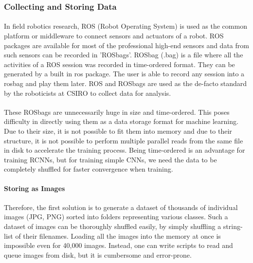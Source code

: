 \newpage
\subsubsection{Collecting and Storing Data}

\paragraph{}
In field robotics research, ROS (Robot Operating System) is used as the common platform or middleware to connect sensors and actuators of a robot. ROS packages are available for most of the professional high-end sensors and data from such sensors can be recorded in 'ROSbags'. ROSbag (.bag) is a file where all the activities of a ROS session was recorded in time-ordered format. They can be generated by a built in ros package. The user is able to record any session into a rosbag and play them later. ROS and ROSbags are used as the de-facto standard by the roboticists at CSIRO to collect data for analysis.

\paragraph{}
These ROSbags are unnecessarily huge in size and time-ordered. This poses difficulty in directly using them as a data storage format for machine learning. Due to their size, it is not possible to fit them into memory and due to their structure, it is not possible to perform multiple parallel reads from the same file in disk to accelerate the training process. Being time-ordered is an advantage for training RCNNs, but for training simple CNNs, we need the data to be completely shuffled for faster convergence when training.

\paragraph{}
\textbf{Storing as Images}

\paragraph{}
Therefore, the first solution is to generate a dataset of thousands of individual images (JPG, PNG) sorted into folders representing various classes. Such a dataset of images can be thoroughly shuffled easily, by simply shuffling a string-list of their filenames. Loading all the images into the memory at once is impossible even for 40,000 images. Instead, one can write scripts to read and queue images from disk, but it is cumbersome and error-prone. 

